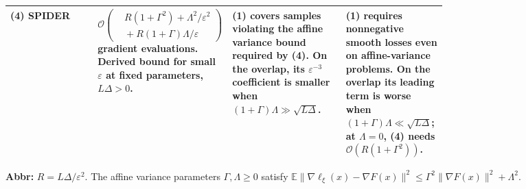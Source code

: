 \begin{table}[tp]
\begin{threeparttable}
\begin{tabularx}{\linewidth}{@{}>{\raggedright\arraybackslash}p{0.20\linewidth}>{\raggedright\arraybackslash}p{0.28\linewidth}>{\raggedright\arraybackslash}p{0.26\linewidth}>{\raggedright\arraybackslash}X@{}}
\midrule
\textbf{(4)} SPIDER \citep[Thm.~4]{avmChenEtAl2023v2}
& $\mathcal{O}\!\left(\begin{aligned}
 &R(1+\Gamma^2)+\Lambda^2/\varepsilon^2\\[-2pt]
 &{}+R(1+\Gamma)\Lambda/\varepsilon
\end{aligned}\right)$ gradient evaluations. Derived bound for small $\varepsilon$ at fixed parameters, $L\Delta>0$.
& \textbf{(1)} covers samples violating the affine variance bound required by \textbf{(4)}. On the overlap, its $\varepsilon^{-3}$ coefficient is smaller when $(1+\Gamma)\Lambda\gg\sqrt{L\Delta}$.
& \textbf{(1)} requires nonnegative smooth losses even on affine-variance problems. On the overlap its leading term is worse when $(1+\Gamma)\Lambda\ll\sqrt{L\Delta}$; at $\Lambda=0$, \textbf{(4)} needs $\mathcal{O}(R(1+\Gamma^2))$. \\
\bottomrule
\end{tabularx}
\begin{tablenotes}[flushleft]\footnotesize
\item[] \textbf{Abbr:} $R=L\Delta/\varepsilon^2$. The affine variance parameters $\Gamma,\Lambda\ge0$ satisfy $\mathbb E\|\nabla\ell_\xi(x)-\nabla F(x)\|^2\le\Gamma^2\|\nabla F(x)\|^2+\Lambda^2$.
\end{tablenotes}
\end{threeparttable}
\end{table}
